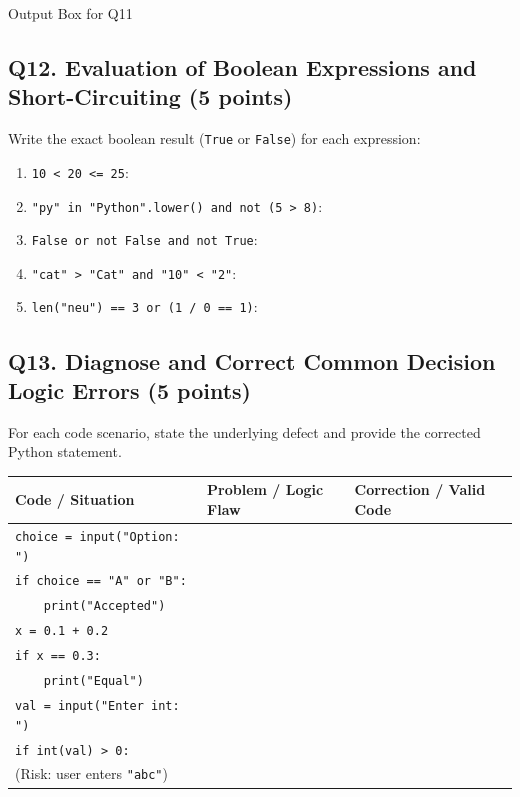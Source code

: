 \documentclass[11pt,a4paper]{article}
\begin{document}
\begin{answerbox}[height=3.0cm]{Output Box for Q11}
\end{answerbox}

\newpage


\subsection*{Q12. Evaluation of Boolean Expressions and Short-Circuiting (5 points)}
Write the exact boolean result (\texttt{True} or \texttt{False}) for each expression:

\begin{enumerate}[label=\alph*),leftmargin=2em,itemsep=2pt]
  \item \texttt{10 < 20 <= 25}: \underline{\hspace{4cm}}
  \item \texttt{"py" in "Python".lower() and not (5 > 8)}: \underline{\hspace{4cm}}
  \item \texttt{False or not False and not True}: \underline{\hspace{4cm}}
  \item \texttt{"cat" > "Cat" and "10" < "2"}: \underline{\hspace{4cm}}
  \item \texttt{len("neu") == 3 or (1 / 0 == 1)}: \underline{\hspace{4cm}}
\end{enumerate}

\subsection*{Q13. Diagnose and Correct Common Decision Logic Errors (5 points)}
For each code scenario, state the underlying defect and provide the corrected Python statement.

\renewcommand{\arraystretch}{1.3}
\begin{tabularx}{\textwidth}{|p{5.1cm}|X|X|}
\hline
\textbf{Code / Situation} & \textbf{Problem / Logic Flaw} & \textbf{Correction / Valid Code} \\
\hline
\texttt{choice = input("Option: ")}\\
\texttt{if choice == "A" or "B":}\\
\texttt{\ \ \ \ print("Accepted")} & & \\[3.5mm]
\hline
\texttt{x = 0.1 + 0.2}\\
\texttt{if x == 0.3:}\\
\texttt{\ \ \ \ print("Equal")} & & \\[3.5mm]
\hline
\texttt{val = input("Enter int: ")}\\
\texttt{if int(val) > 0:}\\
(Risk: user enters \texttt{"abc"}) & & \\[3.5mm]
\hline
\end{tabularx}
\end{document}
